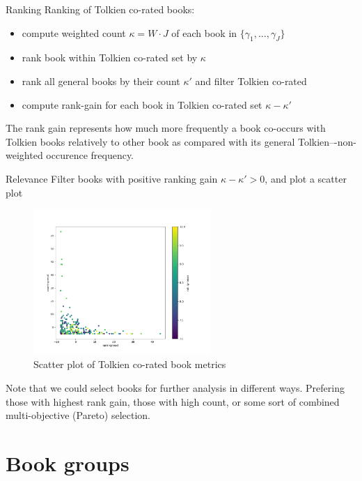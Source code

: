 \documentclass[9pt]{beamer}
\begin{document}
\begin{frame}{Ranking}
	Ranking of Tolkien co-rated books:\\
	\begin{itemize}
		\item compute weighted count $\kappa=W\cdot J$ of each book in $\{\gamma_1,\ldots,\gamma_J\}$
		\item rank book within Tolkien co-rated set by $\kappa$
		\item rank all general books by their count $\kappa'$ and filter Tolkien co-rated
		\item compute rank-gain for each book in Tolkien co-rated set $\kappa - \kappa'$ 
	\end{itemize}
	The rank gain represents how much more frequently a book co-occurs with Tolkien books relatively to other book as compared with its general Tolkien–-non-weighted occurence frequency.
\end{frame}

\begin{frame}{Relevance}
	Filter books with positive ranking gain $\kappa - \kappa' > 0$, and plot a scatter plot\\
	\begin{figure}
		\centering
		\includegraphics[width=0.6\textwidth]{../img/rank-scatter.png}
		\caption{Scatter plot of Tolkien co-rated book metrics}
	\end{figure}
	Note that we could select books for further analysis in different ways. Prefering those with highest rank gain, those with high count, or some sort of combined multi-objective (Pareto) selection.
\end{frame}

\section{Book groups}
\end{document}
